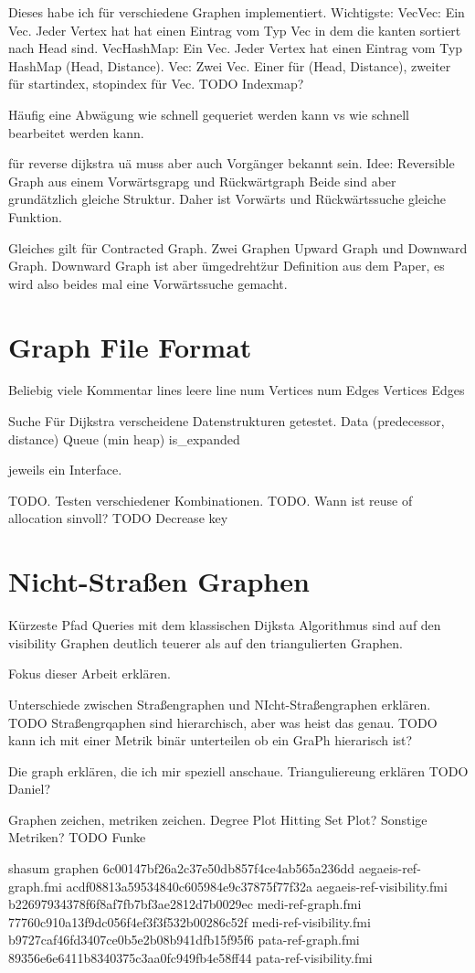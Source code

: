 Dieses habe ich für verschiedene Graphen implementiert.
Wichtigste:
VecVec: Ein Vec. Jeder Vertex hat hat einen Eintrag vom Typ Vec in dem die kanten sortiert nach Head sind.
VecHashMap: Ein Vec. Jeder Vertex hat einen Eintrag vom Typ HashMap (Head, Distance).
Vec: Zwei Vec. Einer für (Head, Distance), zweiter für startindex, stopindex für Vec.
TODO Indexmap?

Häufig eine Abwägung wie schnell gequeriet werden kann vs wie schnell bearbeitet werden kann.


für reverse dijkstra uä muss aber auch Vorgänger bekannt sein.
Idee: Reversible Graph aus einem Vorwärtsgrapg und Rückwärtgraph
Beide sind aber grundätzlich gleiche Struktur. Daher ist Vorwärts und Rückwärtssuche gleiche Funktion.


Gleiches gilt für Contracted Graph. Zwei Graphen Upward Graph und Downward Graph. Downward Graph ist aber \"umgedreht\" zur Definition aus dem Paper, es wird also beides mal eine Vorwärtssuche gemacht.


\section{Graph File Format}
Beliebig viele Kommentar lines
leere line
num Vertices
num Edges
Vertices
Edges

Suche
Für Dijkstra verscheidene Datenstrukturen getestet.
Data (predecessor, distance)
Queue (min heap)
is\_expanded

jeweils ein Interface.

TODO. Testen verschiedener Kombinationen.
TODO. Wann ist reuse of allocation sinvoll?
TODO Decrease key


\section{Nicht-Straßen Graphen}



Kürzeste Pfad Queries mit dem klassischen Dijksta Algorithmus sind auf den visibility Graphen deutlich teuerer als auf den triangulierten Graphen.


Fokus dieser Arbeit erklären.

Unterschiede zwischen Straßengraphen und NIcht-Straßengraphen erklären.
TODO Straßengrqaphen sind hierarchisch, aber was heist das genau.
TODO kann ich mit einer Metrik binär unterteilen ob ein GraPh hierarisch ist?

Die graph erklären, die ich mir speziell anschaue.
Trianguliereung erklären TODO Daniel?

Graphen zeichen, metriken zeichen.
Degree Plot
Hitting Set Plot?
Sonstige Metriken? TODO Funke


shasum graphen
6c00147bf26a2c37e50db857f4ce4ab565a236dd  aegaeis-ref-graph.fmi
acdf08813a59534840c605984e9c37875f77f32a  aegaeis-ref-visibility.fmi
b22697934378f6f8af7fb7bf3ae2812d7b0029ec  medi-ref-graph.fmi
77760c910a13f9dc056f4ef3f3f532b00286c52f  medi-ref-visibility.fmi
b9727caf46fd3407ce0b5e2b08b941dfb15f95f6  pata-ref-graph.fmi
89356e6e6411b8340375c3aa0fc949fb4e58ff44  pata-ref-visibility.fmi
